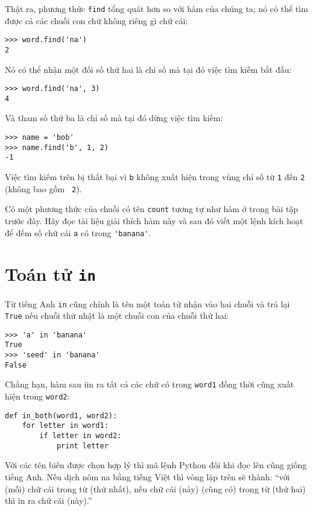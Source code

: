 \documentclass[11pt]{book}
\begin{document}
Thật ra, phương thức {\tt find} tổng quát hơn so với hàm của chúng ta;
nó có thể tìm được cả các chuỗi con chứ không riêng gì chữ cái:

\beforeverb
\begin{verbatim}
>>> word.find('na')
2
\end{verbatim}
\afterverb
%
Nó có thể nhận một đối số thứ hai là chỉ số mà tại đó việc tìm kiếm bắt đầu:


\beforeverb
\begin{verbatim}
>>> word.find('na', 3)
4
\end{verbatim}
\afterverb
%
Và tham số thứ ba là chỉ số mà tại đó dừng việc tìm kiếm:

\beforeverb
\begin{verbatim}
>>> name = 'bob'
>>> name.find('b', 1, 2)
-1
\end{verbatim}
\afterverb
%
Việc tìm kiếm trên bị thất bại vì {\tt b} không xuất hiện trong vùng
chỉ số từ {\tt 1} đến {\tt 2} (không bao gồm {\tt
2}).


\begin{ex}

Có một phương thức của chuỗi có tên {\tt count} tương tự như hàm
ở trong bài tập trước đây. Hãy đọc tài liệu giải thích hàm này và
sau đó viết một lệnh kích hoạt để đếm số chữ cái {\tt a} có trong
\verb"'banana'".
\end{ex}


\section{Toán tử {\tt in}}
\label{inboth}


Từ tiếng Anh {\tt in} cũng chính là tên một toán tử nhận vào hai chuỗi
và trả lại {\tt True} nếu chuỗi thứ nhật là một chuỗi con của chuỗi thứ hai:

\beforeverb
\begin{verbatim}
>>> 'a' in 'banana'
True
>>> 'seed' in 'banana'
False
\end{verbatim}
\afterverb
%
Chẳng hạn, hàm sau iin ra tất cả các chữ có trong
 {\tt word1} đồng thời cũng xuất hiện trong {\tt word2}:

\beforeverb
\begin{verbatim}
def in_both(word1, word2):
    for letter in word1:
        if letter in word2:
            print letter
\end{verbatim}
\afterverb
%
Với các tên biến được chọn hợp lý thì mã lệnh Python
đôi khi đọc lên cũng giống tiếng Anh. Nếu dịch nôm na bằng
tiếng Việt thì vòng lặp trên sẽ thành:
``với (mỗi) chữ cái trong từ (thứ nhất), nếu chữ cái (này) 
(cũng có) trong từ (thứ hai) thì in ra chữ cái (này).''
\end{document}
